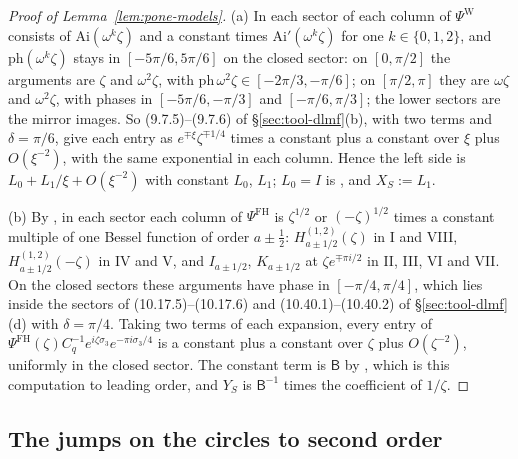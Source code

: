 \begin{proof}[Proof of Lemma~\textup{\ref{lem:pone-models}}]
(a) In each sector of \cite[(6.8)]{WLXZ} each column of $\Psi^{\mathrm W}$ consists of $\mathrm{Ai}(\omega^k\zeta)$ and a constant
times $\mathrm{Ai}'(\omega^k\zeta)$ for one $k\in\{0,1,2\}$, and $\mathrm{ph}(\omega^k\zeta)$ stays in $[-5\pi/6,5\pi/6]$ on the closed
sector: on $[0,\pi/2]$ the arguments are $\zeta$ and $\omega^2\zeta$, with $\mathrm{ph}\,\omega^2\zeta\in[-2\pi/3,-\pi/6]$; on
$[\pi/2,\pi]$ they are $\omega\zeta$ and $\omega^2\zeta$, with phases in $[-5\pi/6,-\pi/3]$ and $[-\pi/6,\pi/3]$; the lower
sectors are the mirror images. So (9.7.5)--(9.7.6) of \S\ref{sec:tool-dlmf}(b), with two terms and $\delta=\pi/6$, give each
entry as $e^{\mp\xi}\zeta^{\mp1/4}$ times a constant plus a constant over $\xi$ plus $O(\xi^{-2})$, with the same exponential
in each column. Hence the left side is $L_0+L_1/\xi+O(\xi^{-2})$ with constant $L_0$, $L_1$; $L_0=I$ is \cite[(6.13)]{WLXZ}, and
$X_S:=L_1$.

(b) By \cite[(4.26)--(4.33)]{Van}, in each sector each column of $\Psi^{\mathrm{FH}}$ is $\zeta^{1/2}$ or $(-\zeta)^{1/2}$ times a
constant multiple of one Bessel function of order $a\pm\frac12$: $H^{(1,2)}_{a\pm1/2}(\zeta)$ in I and VIII,
$H^{(1,2)}_{a\pm1/2}(-\zeta)$ in IV and V, and $I_{a\pm1/2}$, $K_{a\pm1/2}$ at $\zeta e^{\mp\pi i/2}$ in II, III, VI and VII. On the
closed sectors these arguments have phase in $[-\pi/4,\pi/4]$, which lies inside the sectors of (10.17.5)--(10.17.6) and
(10.40.1)--(10.40.2) of \S\ref{sec:tool-dlmf}(d) with $\delta=\pi/4$. Taking two terms of each expansion, every entry of
$\Psi^{\mathrm{FH}}(\zeta)C_q^{-1}e^{i\zeta\sigma_3}e^{-\pi i\sigma_3/4}$ is a constant plus a constant over $\zeta$ plus
$O(\zeta^{-2})$, uniformly in the closed sector. The constant term is $\mathsf B$ by \cite[(4.43)--(4.46)]{Van}, which is this
computation to leading order, and $Y_S$ is $\mathsf B^{-1}$ times the coefficient of $1/\zeta$.
\end{proof}

\subsection{The jumps on the circles to second order}\label{app:pone-jumps}

